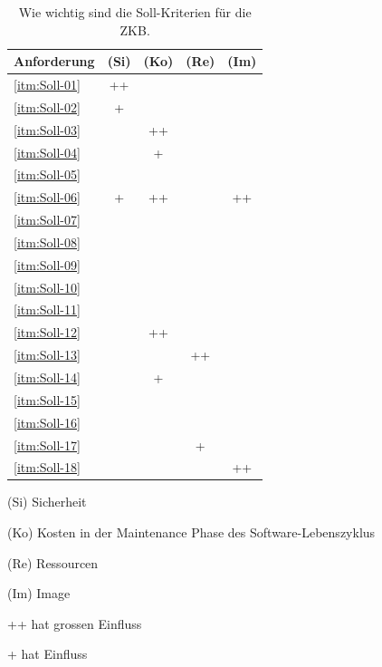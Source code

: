   \begin{table}[h!]
    \sffamily 
    \begin{center}
      \begin{threeparttable}
        \begin{tabular}{p{9cm}cccc}
          \toprule
          Anforderung & (Si) & (Ko) & (Re) & (Im)\\
          \midrule
          \ref{itm:Soll-01} & ++ &    &    &    \\
          \ref{itm:Soll-02} & +  &    &    &    \\
          \ref{itm:Soll-03} &    & ++ &    &    \\
          \ref{itm:Soll-04} &    & +  &    &    \\
          \ref{itm:Soll-05} &    &    &    &    \\
          \ref{itm:Soll-06} & +  & ++ &    & ++ \\
          \ref{itm:Soll-07} &    &    &    &    \\
          \ref{itm:Soll-08} &    &    &    &    \\
          \ref{itm:Soll-09} &    &    &    &    \\
          \ref{itm:Soll-10} &    &    &    &    \\
          \ref{itm:Soll-11} &    &    &    &    \\
          \ref{itm:Soll-12} &    & ++ &    &    \\
          \ref{itm:Soll-13} &    &    & ++ &    \\
          \ref{itm:Soll-14} &    & +  &    &    \\
          \ref{itm:Soll-15} &    &    &    &    \\
          \ref{itm:Soll-16} &    &    &    &    \\
          \ref{itm:Soll-17} &    &    & +  &    \\
          \ref{itm:Soll-18} &    &    &    & ++ \\
          \bottomrule
        \end{tabular}
        \caption{Wie wichtig sind die Soll-Kriterien für die ZKB.}
        \label{tab:kosolidierungDerSollKriterien}
        \medskip 
        \begin{tablenotes}[++]\footnotesize 
          \item[(Si)] Sicherheit 
          \item[(Ko)] Kosten in der Maintenance Phase des Software-Lebenszyklus
          \item[(Re)] Ressourcen 
          \item[(Im)] Image
          \item[++] hat grossen Einfluss
          \item[+] hat Einfluss
        \end{tablenotes}
      \end{threeparttable}
    \end{center}
  \end{table}
  
